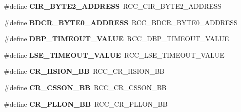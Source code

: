 \begin{DoxyCompactItemize}
\item 
\hypertarget{group___h_a_l___r_c_c___aliased_gaab58c3f3f81bf1ab9a14cf3fececd8c4}{\#define {\bfseries C\-I\-R\-\_\-\-B\-Y\-T\-E2\-\_\-\-A\-D\-D\-R\-E\-S\-S}~R\-C\-C\-\_\-\-C\-I\-R\-\_\-\-B\-Y\-T\-E2\-\_\-\-A\-D\-D\-R\-E\-S\-S}\label{group___h_a_l___r_c_c___aliased_gaab58c3f3f81bf1ab9a14cf3fececd8c4}

\item 
\hypertarget{group___h_a_l___r_c_c___aliased_ga991be15dda03061a29712e8206a32510}{\#define {\bfseries B\-D\-C\-R\-\_\-\-B\-Y\-T\-E0\-\_\-\-A\-D\-D\-R\-E\-S\-S}~R\-C\-C\-\_\-\-B\-D\-C\-R\-\_\-\-B\-Y\-T\-E0\-\_\-\-A\-D\-D\-R\-E\-S\-S}\label{group___h_a_l___r_c_c___aliased_ga991be15dda03061a29712e8206a32510}

\item 
\hypertarget{group___h_a_l___r_c_c___aliased_ga3508fa29d62b42d7d9117c419e076efc}{\#define {\bfseries D\-B\-P\-\_\-\-T\-I\-M\-E\-O\-U\-T\-\_\-\-V\-A\-L\-U\-E}~R\-C\-C\-\_\-\-D\-B\-P\-\_\-\-T\-I\-M\-E\-O\-U\-T\-\_\-\-V\-A\-L\-U\-E}\label{group___h_a_l___r_c_c___aliased_ga3508fa29d62b42d7d9117c419e076efc}

\item 
\hypertarget{group___h_a_l___r_c_c___aliased_ga0965572baea57cdfd3616bef14d41053}{\#define {\bfseries L\-S\-E\-\_\-\-T\-I\-M\-E\-O\-U\-T\-\_\-\-V\-A\-L\-U\-E}~R\-C\-C\-\_\-\-L\-S\-E\-\_\-\-T\-I\-M\-E\-O\-U\-T\-\_\-\-V\-A\-L\-U\-E}\label{group___h_a_l___r_c_c___aliased_ga0965572baea57cdfd3616bef14d41053}

\item 
\hypertarget{group___h_a_l___r_c_c___aliased_gac3290a833c0e35ec17d32c2d494e6133}{\#define {\bfseries C\-R\-\_\-\-H\-S\-I\-O\-N\-\_\-\-B\-B}~R\-C\-C\-\_\-\-C\-R\-\_\-\-H\-S\-I\-O\-N\-\_\-\-B\-B}\label{group___h_a_l___r_c_c___aliased_gac3290a833c0e35ec17d32c2d494e6133}

\item 
\hypertarget{group___h_a_l___r_c_c___aliased_gaca914aed10477ae4090fea0a9639b1ea}{\#define {\bfseries C\-R\-\_\-\-C\-S\-S\-O\-N\-\_\-\-B\-B}~R\-C\-C\-\_\-\-C\-R\-\_\-\-C\-S\-S\-O\-N\-\_\-\-B\-B}\label{group___h_a_l___r_c_c___aliased_gaca914aed10477ae4090fea0a9639b1ea}

\item 
\hypertarget{group___h_a_l___r_c_c___aliased_ga3f1fb2589cb8b5ac2f7121aba1135a5f}{\#define {\bfseries C\-R\-\_\-\-P\-L\-L\-O\-N\-\_\-\-B\-B}~R\-C\-C\-\_\-\-C\-R\-\_\-\-P\-L\-L\-O\-N\-\_\-\-B\-B}\label{group___h_a_l___r_c_c___aliased_ga3f1fb2589cb8b5ac2f7121aba1135a5f}


\end{DoxyCompactItemize}
